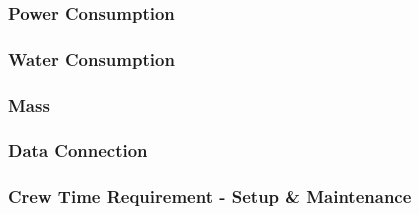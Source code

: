 \documentclass{report}
\begin{document}
\subsubsection{Power Consumption} 




\subsubsection{Water Consumption}





\subsubsection{Mass} 




\subsubsection{Data Connection} 




\subsubsection{Crew Time Requirement - Setup \& Maintenance} 


\end{document}
